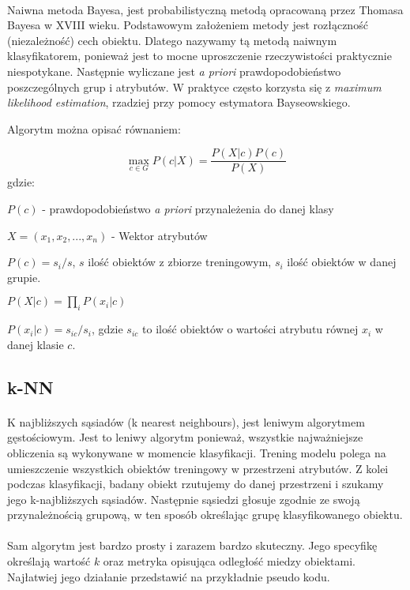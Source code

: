 \documentclass[a4paper,12pt]{article}
\begin{document}
\paragraph{}

Naiwna metoda Bayesa, jest probabilistyczną metodą opracowaną przez Thomasa
Bayesa w XVIII wieku. Podstawowym założeniem metody jest rozłączność
(niezależność) cech obiektu. Dlatego nazywamy tą metodą naiwnym
klasyfikatorem, ponieważ jest to mocne uproszczenie rzeczywistości
praktycznie niespotykane. Następnie wyliczane jest \textit{a priori}
prawdopodobieństwo poszczególnych grup i atrybutów. W praktyce często
korzysta się z  \textit{maximum likelihood estimation}, rzadziej przy pomocy
estymatora Bayseowskiego.

Algorytm można opisać równaniem:

\[
\max_{c \in G} P(c | X) = \frac{P(X|c)P(c)}{P(X)}
\]
gdzie:

$P(c)$ - prawdopodobieństwo \textit{a priori} przynależenia do danej klasy

$X = (x_1,x_2,...,x_n)$ - Wektor atrybutów 

$P(c) = s_i / s$, $s$ ilość obiektów z zbiorze treningowym, $s_i$ ilość obiektów w danej grupie. 

$P(X|c) = \prod\limits_{i} P(x_i | c)$

$P(x_i | c) = s_{ic} / s_i$, gdzie $s_{ic}$ to ilość obiektów o wartości atrybutu równej $x_i$ w danej klasie $c$.


\subsection{k-NN}
\paragraph{}
K najbliższych sąsiadów (k nearest neighbours), jest leniwym algorytmem
gęstościowym. Jest to leniwy algorytm ponieważ, wszystkie najważniejsze
obliczenia są wykonywane w momencie klasyfikacji. Trening modelu polega na
umieszczenie wszystkich obiektów treningowy w przestrzeni atrybutów. Z kolei
podczas klasyfikacji, badany obiekt rzutujemy do danej przestrzeni i szukamy
jego k-najbliższych sąsiadów. Następnie sąsiedzi głosuje zgodnie ze swoją
przynależnością grupową, w ten sposób określając grupę klasyfikowanego
obiektu. 

\paragraph{} Sam algorytm jest bardzo prosty i zarazem bardzo skuteczny. Jego
specyfikę określają wartość $k$ oraz metryka opisująca odległość miedzy
obiektami. Najłatwiej jego działanie przedstawić na przykładnie pseudo kodu.
\end{document}
